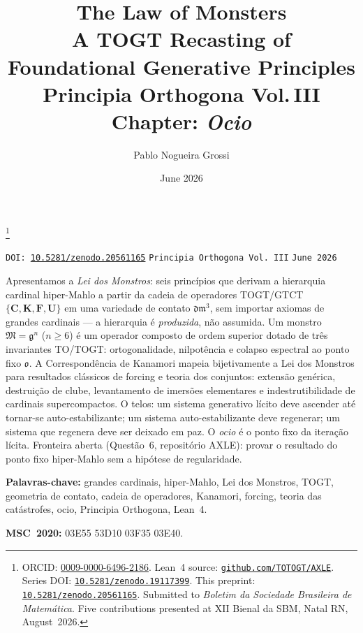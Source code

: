 \documentclass[12pt,a4paper]{amsart}
\newcommand{\doinote}[1]{\href{https://doi.org/#1}{\texttt{#1}}}
\theoremstyle{definition}
\theoremstyle{remark}
\newcommand{\Cop}{\mathbf{C}}
\newcommand{\Kop}{\mathbf{K}}
\newcommand{\Fop}{\mathbf{F}}
\newcommand{\Uop}{\mathbf{U}}
\newcommand{\GG}{\mathfrak{g}}
\newcommand{\MM}{\mathfrak{M}}
\newcommand{\dm}{\mathfrak{dm}^3}
\newcommand{\ocio}{\mathfrak{o}}
\begin{document}
\title[The Law of Monsters]{%
  \textbf{The Law of Monsters}\\[4pt]
  {\large A TOGT Recasting of Foundational Generative Principles}\\[2pt]
  {\normalsize Principia Orthogona \textperiodcentered{} Vol.\,III \textperiodcentered{} Chapter: \textit{Ocio}}
}
\author{Pablo Nogueira Grossi}
\address{G6 LLC, Newark, New Jersey, USA}
\thanks{ORCID: \href{https://orcid.org/0009-0000-6496-2186}{0009-0000-6496-2186}.
  Lean~4 source: \href{https://github.com/TOTOGT/AXLE}{\texttt{github.com/TOTOGT/AXLE}}.
  Series DOI: \doinote{10.5281/zenodo.19117399}.
  This preprint: \doinote{10.5281/zenodo.20561165}.
  Submitted to \textit{Boletim da Sociedade Brasileira de Matemática}.
  Five contributions presented at XII Bienal da SBM, Natal RN, August~2026.}
\date{June 2026}
\maketitle
\thispagestyle{fancy}

\begin{center}
\small
\texttt{DOI: \href{https://doi.org/10.5281/zenodo.20561165}{10.5281/zenodo.20561165}}
\quad\textbullet\quad
\texttt{Principia Orthogona Vol.~III}
\quad\textbullet\quad
\texttt{June 2026}
\end{center}
\medskip


\begin{tcolorbox}[abstractPT]

Apresentamos a \emph{Lei dos Monstros}: seis princípios que derivam a hierarquia
cardinal hiper-Mahlo a partir da cadeia de operadores TOGT/GTCT
$\{\Cop,\Kop,\Fop,\Uop\}$ em uma variedade de contato $\dm$, sem importar axiomas
de grandes cardinais --- a hierarquia é \emph{produzida}, não assumida.
Um monstro $\MM = \GG^n$ ($n \geq 6$) é um operador composto de ordem superior
dotado de três invariantes TO/TOGT: ortogonalidade, nilpotência e colapso espectral
ao ponto fixo $\ocio$.
A Correspondência de Kanamori mapeia bijetivamente a Lei dos Monstros para
resultados clássicos de forcing e teoria dos conjuntos: extensão genérica,
destruição de clube, levantamento de imersões elementares e indestrutibilidade
de cardinais supercompactos.
O telos: um sistema generativo lícito deve ascender até tornar-se auto-estabilizante;
um sistema auto-estabilizante deve regenerar; um sistema que regenera deve ser
deixado em paz.
O \emph{ocio} é o ponto fixo da iteração lícita.
Fronteira aberta (Questão~6, repositório AXLE): provar o resultado do ponto fixo
hiper-Mahlo sem a hipótese de regularidade.

\medskip
\textbf{Palavras-chave:} grandes cardinais, hiper-Mahlo, Lei dos Monstros, TOGT,
geometria de contato, cadeia de operadores, Kanamori, forcing, teoria das
catástrofes, ocio, Principia Orthogona, Lean~4.

\smallskip
\textbf{MSC~2020:} 03E55 \textperiodcentered{} 53D10 \textperiodcentered{} 03F35 \textperiodcentered{} 03E40.

\end{tcolorbox}
\end{document}
